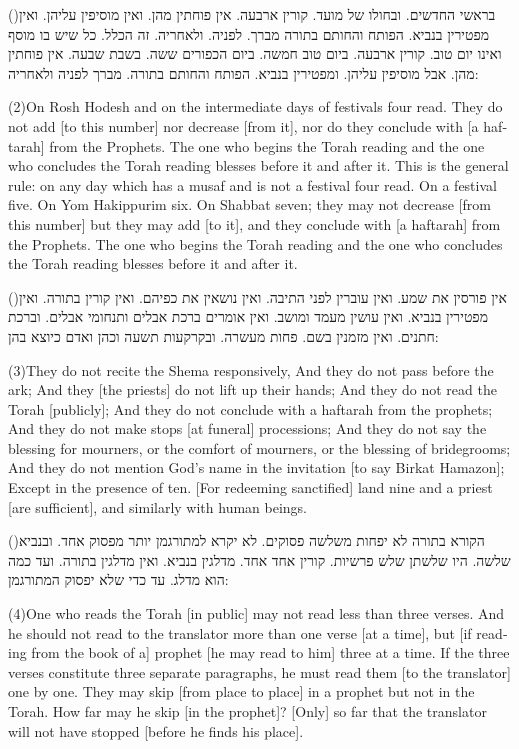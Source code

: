\documentclass[12pt, openany]{book}
\newcommand{\sethebfont}{
\fontsize{10.5pt}{13.1pt} \selectfont
}
\newcommand{\hebeng}[2]{
	{\sethebfont #1\\}
	
	\begin{english}
		#2
	\end{english}
	\clearpage
}
\newcommand{\vsnum}[1]{(\hebrewnumeral{#1})\space}
\newcommand{\vsnumeng}[1]{(#1)\space}
\begin{document}
\hebeng{\vsnum{2}בראשי החדשים. ובחולו של מועד. קורין ארבעה. אין פוחתין מהן. ואין מוסיפין עליהן. ואין מפטירין בנביא. הפותח והחותם בתורה מברך. לפניה. ולאחריה. זה הכלל. כל שיש בו מוסף ואינו יום טוב. קורין ארבעה. ביום טוב חמשה. ביום הכפורים ששה. בשבת שבעה. אין פוחתין מהן. אבל מוסיפין עליהן. ומפטירין בנביא. הפותח והחותם בתורה. מברך לפניה ולאחריה: }{\vsnumeng{2}On Rosh Hodesh and on the intermediate days of festivals four read. They do not add {[to this number]} nor decrease {[from it]}, nor do they conclude with {[a haftarah]} from the Prophets. The one who begins the Torah reading and the one who concludes the Torah reading blesses before it and after it. This is the general rule: on any day which has a musaf and is not a festival four read. On a festival five. On Yom Hakippurim six. On Shabbat seven; they may not decrease {[from this number]} but they may add {[to it]}, and they conclude with {[a haftarah]} from the Prophets. The one who begins the Torah reading and the one who concludes the Torah reading blesses before it and after it.}%

\hebeng{\vsnum{3}אין פורסין את שמע. ואין עוברין לפני התיבה. ואין נושאין את כפיהם. ואין קורין בתורה. ואין מפטירין בנביא. ואין עושין מעמד ומושב. ואין אומרים ברכת אבלים ותנחומי אבלים. וברכת חתנים. ואין מזמנין בשם. פחות מעשרה. ובקרקעות תשעה וכהן ואדם כיוצא בהן: }{\vsnumeng{3}They do not recite the Shema responsively, And they do not pass before the ark; And they {[the priests]} do not lift up their hands; And they do not read the Torah {[publicly]}; And they do not conclude with a haftarah from the prophets; And they do not make stops {[at funeral]} processions; And they do not say the blessing for mourners, or the comfort of mourners, or the blessing of bridegrooms; And they do not mention God’s name in the invitation {[to say Birkat Hamazon]}; Except in the presence of ten. {[For redeeming sanctified]} land nine and a priest {[are sufficient]}, and similarly with human beings.}%

\hebeng{\vsnum{4}הקורא בתורה לא יפחות משלשה פסוקים. לא יקרא למתורגמן יותר מפסוק אחד. ובנביא שלשה. היו שלשתן שלש פרשיות. קורין אחד אחד. מדלגין בנביא. ואין מדלגין בתורה. ועד כמה הוא מדלג. עד כדי שלא יפסוק המתורגמן: }{\vsnumeng{4}One who reads the Torah {[in public]} may not read less than three verses. And he should not read to the translator more than one verse {[at a time]}, but {[if reading from the book of a]} prophet {[he may read to him]} three at a time. If the three verses constitute three separate paragraphs, he must read them {[to the translator]} one by one. They may skip {[from place to place]} in a prophet but not in the Torah. How far may he skip {[in the prophet]}? {[Only]} so far that the translator will not have stopped {[before he finds his place]}.}%
\end{document}
